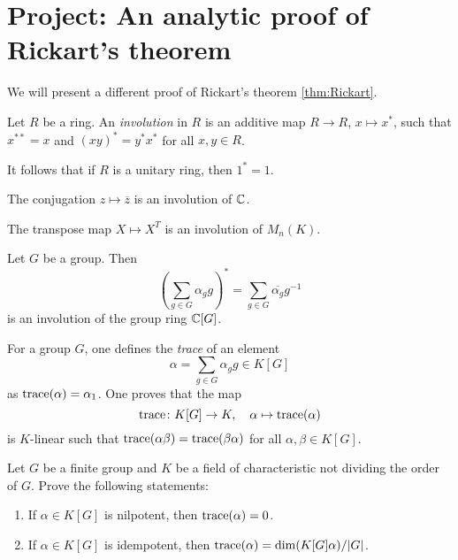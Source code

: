 \section*{Project: An analytic proof of Rickart's theorem}
\label{section:Rickart} 

We will present a different proof 
of Rickart's theorem \ref{thm:Rickart}. 

\begin{definition}
	Let $R$ be a ring. An \emph{involution} 
    in $R$ is an additive map  
    $R\to R$, $x\mapsto x^*$, such that $x^{**}=x$ and  $(xy)^*=y^*x^*$ for all 
	$x,y\in R$.
\end{definition}

It follows that if $R$ is a unitary ring, then 
$1^*=1$.

\begin{example}
	The conjugation $z\mapsto\overline{z}$ is an 
    involution of $\mathbb{C}$.
\end{example}

\begin{example}
	The transpose map $X\mapsto X^T$ is an involution of $M_n(K)$.
\end{example}

\begin{example}
	Let $G$ be a group. 
    Then \[
    \left(\sum_{g\in G}\alpha_gg\right)^*=\sum_{g\in G}\overline{\alpha_g}g^{-1}
    \]
	is an involution of the group ring $\mathbb{C}[G]$.
\end{example}

For a group $G$, one defines the \emph{trace} 
of an element 
\[
\alpha=\sum_{g\in G}\alpha_gg\in K[G]
\]
as $\operatorname{trace}(\alpha)=\alpha_1$. One proves that 
the map 
\[
\operatorname{trace}\colon K[G]\to K,\quad 
\alpha\mapsto\operatorname{trace}(\alpha)
\]
is $K$-linear such that   
$\operatorname{trace}(\alpha\beta)=\operatorname{trace}(\beta\alpha)$ for 
all $\alpha,\beta\in K[G]$. 

\begin{exercise}
	Let $G$ be a finite group and $K$ 
 be a field of characteristic not dividing the 
 order of $G$.
	Prove the following statements: 
	\begin{enumerate}
		\item If $\alpha\in K[G]$ is nilpotent, then $\operatorname{trace}(\alpha)=0$.
		\item If $\alpha\in K[G]$ is idempotent, then $\operatorname{trace}(\alpha)=\dim
			(K[G]\alpha)/|G|$.
	\end{enumerate}
\end{exercise}

